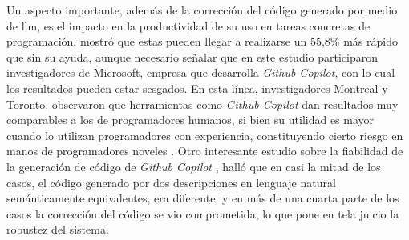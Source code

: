 Un aspecto importante, además de la corrección del código generado por medio de \gls{llm}, es el impacto en la productividad de su uso en tareas concretas de programación. \citep{pengImpactAIDeveloper2023a} mostró que estas pueden llegar a realizarse un 55,8\% más rápido que sin su ayuda, aunque necesario señalar que en este estudio participaron investigadores de Microsoft, empresa que desarrolla \textit{Github Copilot}, con lo cual los resultados pueden estar sesgados. En esta línea, investigadores Montreal y Toronto, observaron que herramientas como \textit{Github Copilot} dan resultados muy comparables a los de programadores humanos, si bien su utilidad es mayor cuando lo utilizan programadores con experiencia, constituyendo cierto riesgo en manos de programadores noveles \citep{moradidakhelGitHubCopilotAI2023}. Otro interesante estudio sobre la fiabilidad de la generación de código de \textit{Github Copilot} \citep{mastropaoloRobustnessCodeGeneration2023}, halló que en casi la mitad de los casos, el código generado por dos descripciones en lenguaje natural semánticamente equivalentes, era diferente, y en más de una cuarta parte de los casos la corrección del código se vio comprometida, lo que pone en tela juicio la robustez del sistema.


